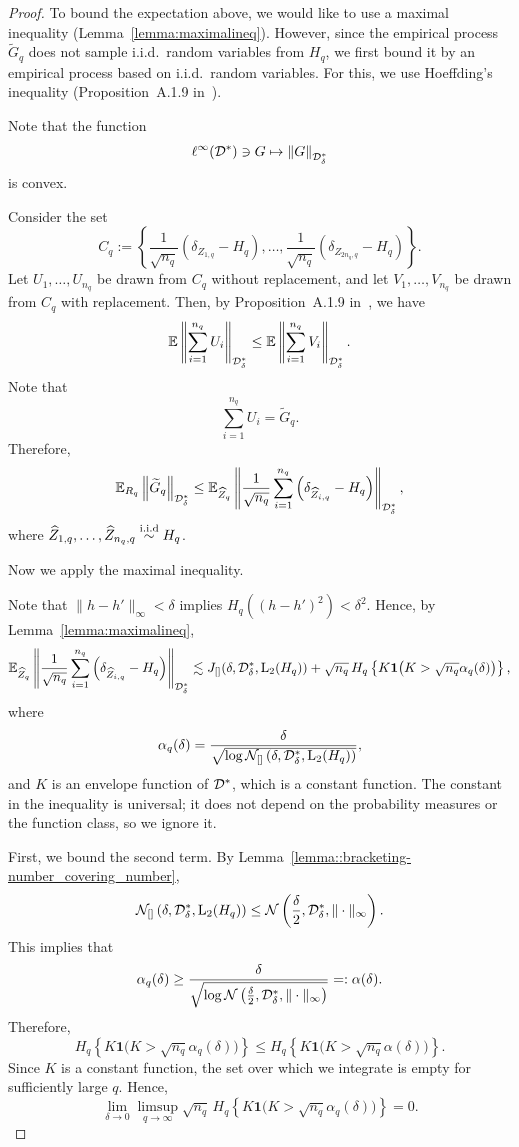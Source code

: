 \begin{proof}
To bound the expectation above, we would like to use a maximal inequality (Lemma~\ref{lemma:maximalineq}). However, since the empirical process $\widetilde{G}_q$ does not sample i.i.d.\ random variables from $H_q$, we first bound it by an empirical process based on i.i.d.\ random variables. For this, we use Hoeffding's inequality (Proposition~A.1.9 in~\cite{van1996weak}).

Note that the function
\[
\ell^\infty(\mathcal{D}^*) \ni G \mapsto \left\|G\right\|_{\mathcal{D}^*_\delta}
\]
is convex.

Consider the set
\[
C_q := \left\{\frac{1}{\sqrt{n_q}}\left(\delta_{Z_{1, q}} - H_q \right),\dots,
\frac{1}{\sqrt{n_q}}\left(\delta_{Z_{2n_q,q}} - H_q \right) \right\}.
\]
Let $U_1,\dots,U_{n_q}$ be drawn from $C_q$ without replacement, and let $V_1,\dots,V_{n_q}$ be drawn from $C_q$ with replacement. Then, by Proposition~A.1.9 in~\cite{van1996weak}, we have
\[
\mathbb{E} \left\| \sum_{i = 1}^{n_q} U_i\right\|_{\mathcal{D}^*_\delta}
\leq
\mathbb{E} \left\| \sum_{i = 1}^{n_q} V_i\right\|_{\mathcal{D}^*_\delta}.
\]
Note that
\[
\sum_{i = 1}^{n_q} U_i = \widetilde{G}_q.
\]
Therefore,
\[
\mathbb{E}_{R_q}\left\| \widetilde{G}_q \right\|_{\mathcal{D}^*_\delta}
\leq
\mathbb{E}_{\widehat{Z}_q}\left\| \frac{1}{\sqrt{n_q}} \sum_{i = 1}^{n_q}\left(\delta_{\widehat{Z}_{i,q}} - H_q\right)\right\|_{\mathcal{D}^*_\delta},
\]
where $\widehat{Z}_{1,q},\dots, \widehat{Z}_{n_q,q}\overset{\mathrm{i.i.d}}{\sim}H_q$.

Now we apply the maximal inequality.

Note that $\|h - h'\|_\infty < \delta$ implies $H_q\left( (h - h')^2\right) < \delta^2$. Hence, by Lemma~\ref{lemma:maximalineq},
\[
\mathbb{E}_{\widehat{Z}_q}\left\| \frac{1}{\sqrt{n_q}} \sum_{i = 1}^{n_q}\left(\delta_{\widehat{Z}_{i,q}} - H_q\right)\right\|_{\mathcal{D}^*_\delta}
\lesssim
J_{[]} (\delta, \mathcal{D}^*_\delta, \mathrm{L}_2(H_q))
+ \sqrt{n_q}\,H_q\left\{K\mathbf{1}\big(K > \sqrt{n_q}\alpha_q(\delta)\big) \right\},
\]
where
\[
\alpha_q(\delta)
= \frac{\delta}{\sqrt{\log \mathcal{N}_{[]}\left(\delta, \mathcal{D}^*_\delta,\mathrm{L}_2(H_q)\right)}},
\]
and $K$ is an envelope function of $\mathcal{D}^*$, which is a constant function. The constant in the inequality is universal; it does not depend on the probability measures or the function class, so we ignore it.

First, we bound the second term. By Lemma~\ref{lemma::bracketing-number_covering_number},
\[
\mathcal{N}_{[]}\left(\delta, \mathcal{D}^*_\delta,\mathrm{L}_2(H_q)\right)
\leq
\mathcal{N}\left(\frac{\delta}{2}, \mathcal{D}^*_\delta,\|\cdot\|_\infty\right).
\]
This implies that
\[
\alpha_q(\delta)
\geq
\frac{\delta}{\sqrt{\log \mathcal{N}\left(\frac{\delta}{2}, \mathcal{D}^*_\delta,\|\cdot\|_\infty\right)}}
=: \alpha(\delta).
\]
Therefore,
\[
H_q\left\{K\mathbf{1}\big(K > \sqrt{n_q}\alpha_q(\delta)\big) \right\}
\leq
H_q\left\{K\mathbf{1}\big(K > \sqrt{n_q}\alpha(\delta)\big) \right\}.
\]
Since $K$ is a constant function, the set over which we integrate is empty for sufficiently large $q$. Hence,
\[
\lim_{\delta \to 0} \limsup_{q \to \infty}
\sqrt{n_q}\,H_q\left\{K\mathbf{1}\big(K > \sqrt{n_q}\alpha_q(\delta)\big) \right\} = 0.
\]


\end{proof}
